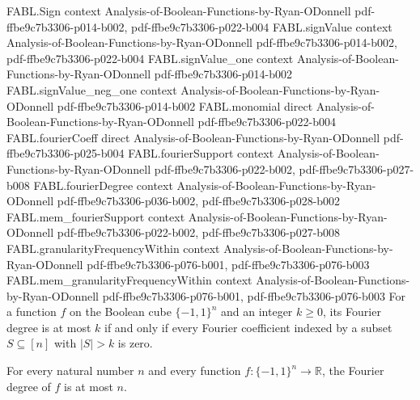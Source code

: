 \begin{theorem}
\label{FABL.fourierDegree_le_iff}
\leanok
{}
\proofstep
  {FABL.Sign}
  {context}
  {Analysis-of-Boolean-Functions-by-Ryan-ODonnell}
  {pdf-ffbe9c7b3306-p014-b002,
    pdf-ffbe9c7b3306-p022-b004}
\proofstep
  {FABL.signValue}
  {context}
  {Analysis-of-Boolean-Functions-by-Ryan-ODonnell}
  {pdf-ffbe9c7b3306-p014-b002,
    pdf-ffbe9c7b3306-p022-b004}
\proofstep
  {FABL.signValue_one}
  {context}
  {Analysis-of-Boolean-Functions-by-Ryan-ODonnell}
  {pdf-ffbe9c7b3306-p014-b002}
\proofstep
  {FABL.signValue_neg_one}
  {context}
  {Analysis-of-Boolean-Functions-by-Ryan-ODonnell}
  {pdf-ffbe9c7b3306-p014-b002}
\proofstep
  {FABL.monomial}
  {direct}
  {Analysis-of-Boolean-Functions-by-Ryan-ODonnell}
  {pdf-ffbe9c7b3306-p022-b004}
\proofstep
  {FABL.fourierCoeff}
  {direct}
  {Analysis-of-Boolean-Functions-by-Ryan-ODonnell}
  {pdf-ffbe9c7b3306-p025-b004}
\proofstep
  {FABL.fourierSupport}
  {context}
  {Analysis-of-Boolean-Functions-by-Ryan-ODonnell}
  {pdf-ffbe9c7b3306-p022-b002,
    pdf-ffbe9c7b3306-p027-b008}
\proofstep
  {FABL.fourierDegree}
  {context}
  {Analysis-of-Boolean-Functions-by-Ryan-ODonnell}
  {pdf-ffbe9c7b3306-p036-b002,
    pdf-ffbe9c7b3306-p028-b002}
\proofstep
  {FABL.mem_fourierSupport}
  {context}
  {Analysis-of-Boolean-Functions-by-Ryan-ODonnell}
  {pdf-ffbe9c7b3306-p022-b002,
    pdf-ffbe9c7b3306-p027-b008}
\proofstep
  {FABL.granularityFrequencyWithin}
  {context}
  {Analysis-of-Boolean-Functions-by-Ryan-ODonnell}
  {pdf-ffbe9c7b3306-p076-b001,
    pdf-ffbe9c7b3306-p076-b003}
\proofstep
  {FABL.mem_granularityFrequencyWithin}
  {context}
  {Analysis-of-Boolean-Functions-by-Ryan-ODonnell}
  {pdf-ffbe9c7b3306-p076-b001,
    pdf-ffbe9c7b3306-p076-b003}
For a function $f$ on the Boolean cube $\{-1,1\}^n$ and an integer $k\ge 0$, its
Fourier degree is at most $k$ if and only if every Fourier coefficient indexed by a
subset $S\subseteq[n]$ with $|S|>k$ is zero.
\end{theorem}

\begin{theorem}
\label{FABL.fourierDegree_le_dimension}
\leanok
{}
For every natural number $n$ and every function $f\colon\{-1,1\}^n\to\mathbb{R}$, the
Fourier degree of $f$ is at most $n$.
\end{theorem}

